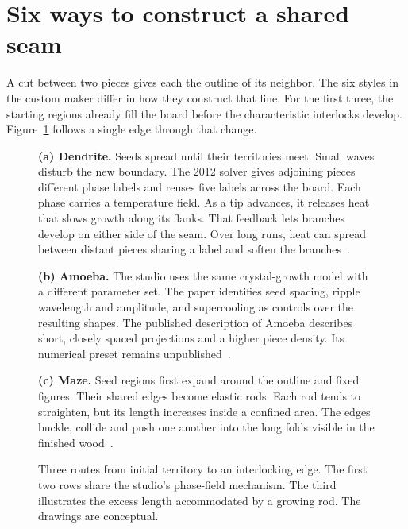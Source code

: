 \section{Six ways to construct a shared seam}
\label{sec:seams}

A cut between two pieces gives each the outline of its neighbor. The six styles
in the custom maker differ in how they construct that line. For the first three,
the starting regions already fill the board before the characteristic interlocks
develop. Figure~\ref{fig:growing-seams} follows a single edge through that change.

\begin{figure}[!ht]
\centering
\begin{minipage}{.98\linewidth}
\textbf{(a) Dendrite.}
Seeds spread until their territories meet. Small waves disturb the new boundary.
The 2012 solver gives adjoining pieces different phase labels and reuses five
labels across the board. Each phase carries a temperature field. As a tip advances,
it releases heat that slows growth along its flanks. That feedback lets branches
develop on either side of the seam. Over long runs, heat can spread between
distant pieces sharing a label and soften the branches~\cite{puzzle2012}.
\par\smallskip
{\centering{}\par}
\medskip
\textbf{(b) Amoeba.}
The studio uses the same crystal-growth model with a different parameter set.
The paper identifies seed spacing, ripple wavelength and amplitude, and
supercooling as controls over the resulting shapes. The published description
of Amoeba describes short, closely spaced projections and a higher piece density.
Its numerical preset remains unpublished~\cite{puzzle2012,cutguide}.
\par\smallskip
{\centering{}\par}
\medskip
\textbf{(c) Maze.}
Seed regions first expand around the outline and fixed figures. Their shared
edges become elastic rods. Each rod tends to straighten, but its length increases
inside a confined area. The edges buckle, collide and push one another into the
long folds visible in the finished wood~\cite{maze}.
\par\smallskip
{\centering{}\par}
\end{minipage}
\caption{Three routes from initial territory to an interlocking edge. The first two
rows share the studio's phase-field mechanism. The third illustrates the excess
length accommodated by a growing rod. The drawings are conceptual.}
\label{fig:growing-seams}
\end{figure}

